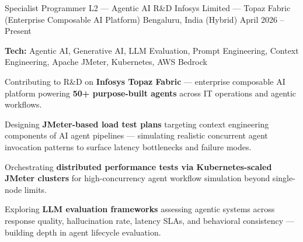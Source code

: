 
\begin{cventries}

\cventry
  {Specialist Programmer L2 --- Agentic AI R\&D}
  {Infosys Limited --- Topaz Fabric (Enterprise Composable AI Platform)}
  {Bengaluru, India (Hybrid)}
  {April 2026 -- Present}
  {
    \begin{cvitems}
      \item {\textbf{Tech:} Agentic AI, Generative AI, LLM Evaluation, Prompt Engineering, Context Engineering, Apache JMeter, Kubernetes, AWS Bedrock}
      \item {Contributing to R\&D on \textbf{Infosys Topaz Fabric} --- enterprise composable AI platform powering \textbf{50+ purpose-built agents} across IT operations and agentic workflows.}
      \item {Designing \textbf{JMeter-based load test plans} targeting context engineering components of AI agent pipelines --- simulating realistic concurrent agent invocation patterns to surface latency bottlenecks and failure modes.}
      \item {Orchestrating \textbf{distributed performance tests via Kubernetes-scaled JMeter clusters} for high-concurrency agent workflow simulation beyond single-node limits.}
      \item {Exploring \textbf{LLM evaluation frameworks} assessing agentic systems across response quality, hallucination rate, latency SLAs, and behavioral consistency --- building depth in agent lifecycle evaluation.}
    \end{cvitems}
  }


\end{cventries}

